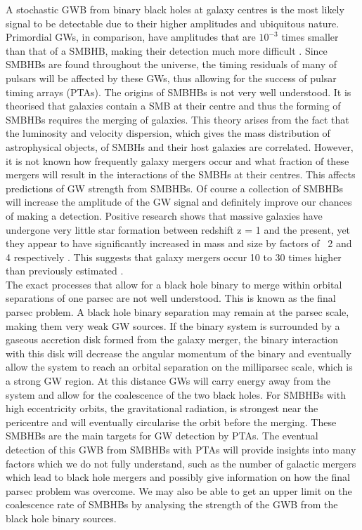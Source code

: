 \documentclass[12pt]{article}
\begin{document}
\noindent A stochastic GWB from binary black holes at galaxy centres is the most likely signal to be detectable due to their higher amplitudes and ubiquitous nature. Primordial GWs, in comparison, have amplitudes that are $10^{-3}$ times smaller than that of a SMBHB, making their detection much more difficult \cite{arzoumanian2016nanograv}. Since SMBHBs are found throughout the universe, the timing residuals of many of pulsars will be affected by these GWs, thus allowing for the success of pulsar timing arrays (PTAs). The origins of SMBHBs is not very well understood. It is theorised that galaxies contain a SMB at their centre and thus the forming of SMBHBs requires the merging of galaxies. This theory arises from the fact that the luminosity and velocity dispersion, which gives the mass distribution of astrophysical objects, of SMBHs and their host galaxies are correlated. However, it is not known how frequently galaxy mergers occur and what fraction of these mergers will result in the interactions of the SMBHs at their centres. This affects predictions of GW strength from SMBHBs. Of course a collection of SMBHBs will increase the amplitude of the GW signal and definitely improve our chances of making a detection. Positive research shows that massive galaxies have undergone very little star formation between redshift z = 1 and the present, yet they appear to have significantly increased in mass and size by factors of ~2 and 4 respectively \cite{van2012stellar}. This suggests that galaxy mergers occur 10 to 30 times higher than previously estimated \cite{mcwilliams2012imminent}.\\	

\noindent The exact processes that allow for a black hole binary to merge within orbital separations of one parsec are not well understood. This is known as the final parsec problem. A black hole binary separation may remain at the parsec scale, making them very weak GW sources. If the binary system is surrounded by a gaseous accretion disk formed from the galaxy merger, the binary interaction with this disk will decrease the angular momentum of the binary and eventually allow the system to reach an orbital separation on the milliparsec scale, which is a strong GW region. At this distance GWs will carry energy away from the system and allow for the coalescence of the two black holes. For SMBHBs with high eccentricity orbits, the gravitational radiation, is strongest near the pericentre and will eventually circularise the orbit before the merging. These SMBHBs are the main targets for GW detection by PTAs. The eventual detection of this GWB from SMBHBs with PTAs will provide insights into many factors which we do not fully understand, such as the number of galactic mergers which lead to black hole mergers and possibly give information on how the final parsec problem was overcome. We may also be able to get an upper limit on the coalescence rate of SMBHBs by analysing the strength of the GWB from the black hole binary sources.\\
\end{document}
